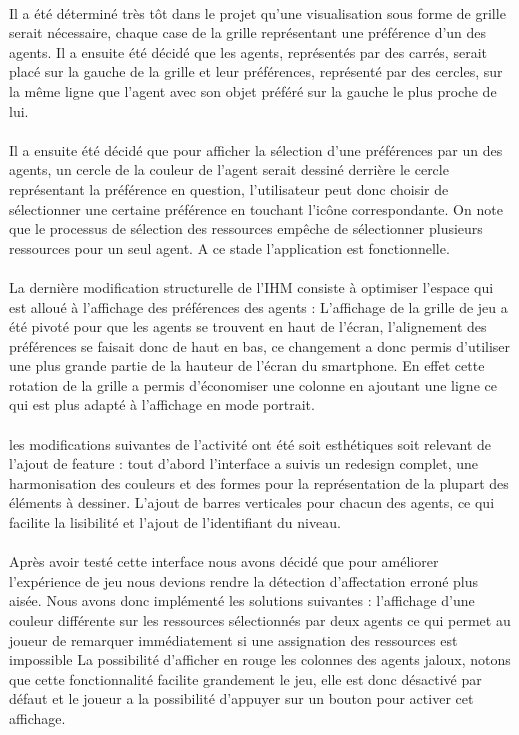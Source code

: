 \documentclass[../main.tex]{subfiles}
\begin{document}
\paragraph{}
Il a été déterminé très tôt dans le projet qu’une visualisation sous forme de grille serait nécessaire, chaque case de la grille représentant une préférence d’un des agents. Il a ensuite été décidé que les agents, représentés par des carrés, serait placé sur la gauche de la grille et leur préférences, représenté par des cercles, sur la même ligne que l’agent avec son objet préféré sur la gauche le plus proche de lui.
\paragraph{}
Il a ensuite été décidé que pour afficher la sélection d’une préférences par un des agents, un cercle de la couleur de l’agent serait dessiné derrière le cercle représentant la préférence en question, l'utilisateur peut donc choisir de sélectionner une certaine préférence en touchant l'icône correspondante. On note que le processus de sélection des ressources empêche de sélectionner plusieurs ressources pour un seul agent. A ce stade l’application est fonctionnelle.
\paragraph{}
La dernière modification structurelle de l’IHM consiste à optimiser l’espace qui est alloué à l’affichage des préférences des agents : L'affichage de la grille de jeu a été pivoté pour que les agents se trouvent en haut de l'écran, l'alignement des préférences se faisait donc de haut en bas, ce changement a donc permis d'utiliser une plus grande partie de la hauteur de l'écran du smartphone. En effet cette rotation de la grille a permis d'économiser une colonne en ajoutant une ligne ce qui est plus adapté à l’affichage en mode portrait.
\paragraph{}
les modifications suivantes de l’activité ont été soit esthétiques soit relevant de l’ajout de feature : tout d’abord l’interface a suivis un redesign complet, une harmonisation des couleurs et des formes pour la représentation de la plupart des éléments à dessiner. L’ajout de barres verticales pour chacun des agents, ce qui facilite la lisibilité et l’ajout de l’identifiant du niveau.
\paragraph{}
    Après avoir testé cette interface nous avons décidé que pour améliorer l'expérience de jeu nous devions rendre la détection d’affectation erroné plus aisée. Nous avons donc implémenté les solutions suivantes :
 l’affichage d’une couleur différente sur les ressources sélectionnés par deux agents ce qui permet au joueur de remarquer immédiatement si une assignation des ressources est impossible
La possibilité d’afficher en rouge les colonnes des agents jaloux, notons que cette fonctionnalité facilite grandement le jeu, elle est donc désactivé par défaut et le joueur a la possibilité d’appuyer sur un bouton pour activer cet affichage.
\end{document}
